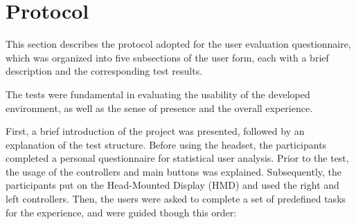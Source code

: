 
\section{Protocol}
\label{sec:protocol}

This section describes the protocol adopted for the user evaluation questionnaire, which was organized into five subsections of the user form, each with a brief description and the corresponding test results.

The tests were fundamental in evaluating the usability 
of the developed environment, as well as the sense of presence 
and the overall experience. 

First, a brief introduction of the project was presented, followed by an explanation of the test structure.
Before using the headset, the participants completed a personal questionnaire for statistical user analysis. 
Prior to the test, the usage of the controllers and main buttons was explained. 
Subsequently, the participants put on the Head-Mounted Display (\gls{HMD}) and used the right and left controllers. 
Then, the users were asked to complete a set of predefined tasks for the experience, and were guided though this order:

